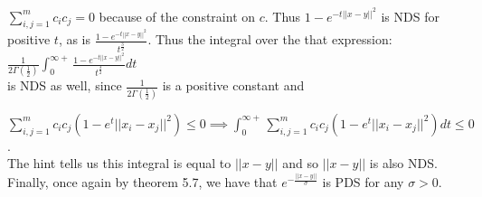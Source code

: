 \documentclass[]{article}
\begin{document}
\noindent $\sum_{i,j=1}^{m} c_i c_j = 0$ because of the constraint on $c$. Thus $1-e^{-t||x-y||^2}$ is NDS for positive $t$, as is $\frac{1-e^{-t||x-y||^2}}{t^{\frac{3}{2}}}$. Thus the integral over the that expression:\\

$\frac{1}{2 \Gamma(\frac{1}{2})}\int_{0}^{\infty +} \frac{1-e^{-t||x-y||^2}}{t^{\frac{3}{2}}}dt$\\ 

\noindent is NDS as well, since $\frac{1}{2 \Gamma(\frac{1}{2})}$ is a positive constant and

\noindent $\sum_{i,j=1}^{m}c_i c_j (1-e^t||x_i - x_j||^2) \le 0 \implies \int_{0}^{\infty +} \sum_{i,j=1}^{m}c_i c_j (1-e^t||x_i - x_j||^2) dt \le 0$.\\

\noindent The hint tells us this integral is equal to $||x-y||$ and so $||x-y||$ is also NDS. Finally, once again by theorem 5.7, we have that $e^{-\frac{||x-y||}{\sigma}}$ is PDS for any $\sigma > 0$. 
\end{document}

